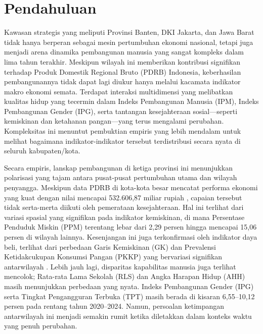 \documentclass[a4paper]{article}
\theoremstyle{definition} %
\begin{document}
\newpage
\section{Pendahuluan}
Kawasan strategis yang meliputi Provinsi Banten, DKI Jakarta, dan Jawa Barat tidak hanya berperan sebagai mesin pertumbuhan ekonomi nasional, tetapi juga menjadi arena dinamika pembangunan manusia yang sangat kompleks dalam lima tahun terakhir. Meskipun wilayah ini memberikan kontribusi signifikan terhadap Produk Domestik Regional Bruto (PDRB) Indonesia, keberhasilan pembangunannya tidak dapat lagi diukur hanya melalui kacamata indikator makro ekonomi semata. Terdapat interaksi multidimensi yang melibatkan kualitas hidup yang tecermin dalam Indeks Pembangunan Manusia (IPM), Indeks Pembangunan Gender (IPG), serta tantangan kesejahteraan sosial—seperti kemiskinan dan ketahanan pangan—yang terus mengalami perubahan. Kompleksitas ini menuntut pembuktian empiris yang lebih mendalam untuk melihat bagaimana indikator-indikator tersebut terdistribusi secara nyata di seluruh kabupaten/kota.

Secara empiris, lanskap pembangunan di ketiga provinsi ini menunjukkan polarisasi yang tajam antara pusat-pusat pertumbuhan utama dan wilayah penyangga. Meskipun data PDRB di kota-kota besar mencatat performa ekonomi yang kuat dengan nilai mencapai 532.606,87 miliar rupiah \citep{bpspdrb}, capaian tersebut tidak serta-merta diikuti oleh pemerataan kesejahteraan. Hal ini terlihat dari variasi spasial yang signifikan pada indikator kemiskinan, di mana Persentase Penduduk Miskin (PPM) terentang lebar dari 2,29 persen hingga mencapai 15,06 persen di wilayah lainnya. Kesenjangan ini juga terkonfirmasi oleh indikator daya beli, terlihat dari perbedaan Garis Kemiskinan (GK) dan Prevalensi Ketidakcukupan Konsumsi Pangan (PKKP) yang bervariasi signifikan antarwilayah \cite{bpspkkp}. Lebih jauh lagi, disparitas kapabilitas manusia juga terlihat mencolok; Rata-rata Lama Sekolah (RLS) dan Angka Harapan Hidup (AHH) masih menunjukkan perbedaan yang nyata. Indeks Pembangunan Gender (IPG) serta Tingkat Pengangguran Terbuka (TPT) masih berada di kisaran 6,55--10,12 persen pada rentang tahun 2020--2024. Namun, persoalan ketimpangan antarwilayah ini menjadi semakin rumit ketika diletakkan dalam konteks waktu yang penuh perubahan.
\end{document}
